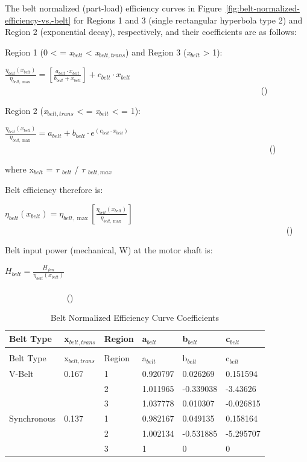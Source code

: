 The belt normalized (part-load) efficiency curves in Figure~\ref{fig:belt-normalized-efficiency-vs.-belt} for Regions 1 and 3 (single rectangular hyperbola type 2) and Region 2 (exponential decay), respectively, and their coefficients are as follows:

Region 1 (0 \textless{} = \emph{x\(_{belt}\)} \textless{} \emph{x\(_{belt,trans}\)}) and Region 3 (\emph{x\(_{belt}\)} \textgreater{} 1):

\(\frac{{{\eta_{belt}}({x_{belt}})}}{{{\eta_{belt,\max }}}} = \left[ {\frac{{{a_{belt}} \cdot {x_{belt}}}}{{{b_{belt}} + {x_{belt}}}}} \right] + {c_{belt}} \cdot {x_{belt}}\) ~~~~~~~~~~~~~~~~~~~~~~~~~~~~~~~~~~~~~~~~~~~~~~~~~~~~~~~~~~~~ ()

Region 2 (\emph{x\(_{belt,trans}\)} \textless{} = \emph{x\(_{belt}\)} \textless{} = 1):

\(\frac{{{\eta_{belt}}({x_{belt}})}}{{{\eta_{belt,\max }}}} = {a_{belt}} + {b_{belt}} \cdot {e^{\left( {{c_{belt}} \cdot {x_{belt}}} \right)}}\) ~~~~~~~~~~~~~~~~~~~~~~~~~~~~~~~~~~~~~~~~~~~~~~~~~~~~~~~~~~~~~~ ()

where x\(_{belt}\) = \(\tau\) \(_{belt}\) / \(\tau\) \(_{belt,max}\)

Belt efficiency therefore is:

\({\eta_{belt}}({x_{belt}}) = {\eta_{belt,\max }}\left[ {\frac{{{\eta_{belt}}({x_{belt}})}}{{{\eta_{belt,\max }}}}} \right]\) ~~~~~~~~~~~~~~~~~~~~~~~~~~~~~~~~~~~~~~~~~~~~~~~~~~~~~~~~~~~~~~~~~~ ()

Belt input power (mechanical, W) at the motor shaft is:

\({H_{belt}} = \frac{{{H_{fan}}}}{{{\eta_{belt}}({x_{belt}})}}\) ~~~~~~~~~~~~~~~~~~~~~~~~~~~~~~~~~~~~~~~~~~~~~~~~~~~~~~~~~~~~~~~~~~~~~~~~~~~~~~~~~~~~~~ ()

\begin{longtable}[l]{@{}llllll@{}}
\caption{Belt Normalized Efficiency Curve Coefficients \label{table:belt-normalized-efficiency-curve-coefficients}} \tabularnewline
\toprule 
Belt Type & x\(_{belt,trans}\) & Region & a\(_{belt}\) & b\(_{belt}\) & c\(_{belt}\) \tabularnewline \midrule
\midrule
\endfirsthead

\caption[]{Belt Normalized Efficiency Curve Coefficients} \tabularnewline
\toprule 
Belt Type & x\(_{belt,trans}\) & Region & a\(_{belt}\) & b\(_{belt}\) & c\(_{belt}\) \tabularnewline \midrule
\midrule
\endhead

V-Belt & 0.167 & 1 & 0.920797 & 0.026269 & 0.151594 \tabularnewline
 & & 2 & 1.011965 & -0.339038 & -3.43626 \tabularnewline
 & & 3 & 1.037778 & 0.010307 & -0.026815 \tabularnewline
Synchronous & 0.137 & 1 & 0.982167 & 0.049135 & 0.158164 \tabularnewline
 & & 2 & 1.002134 & -0.531885 & -5.295707 \tabularnewline
 & & 3 & 1 & 0 & 0 \tabularnewline
\bottomrule
\end{longtable}

